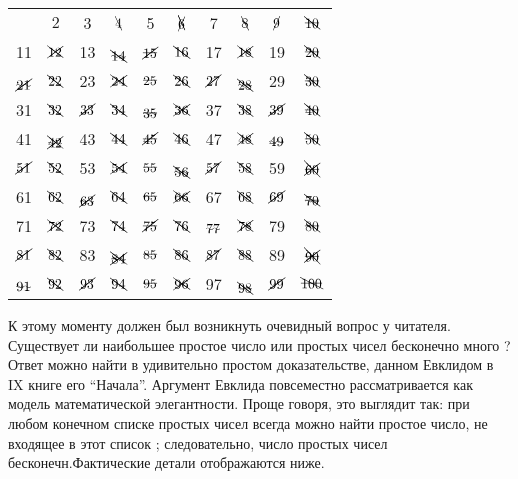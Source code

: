 \documentclass[11pt]{article}
\newcommand{\out}[1]{\raisebox{1pt}{\sout{\phantom{#1}}}\llap{#1}}
\newcommand{\wavy}[1]{\raisebox{5pt}{\uwave{\phantom{#1}}}\llap{#1}}
\begin{document}
\begin{center}
\begin {tabular}{c c c c c c c c c c}
 &$2$&3&$\bcancel4$&5&$\bcancel{\cancel6}$&7&$\bcancel8$&$\cancel9$&$\bcancel{\out{10}}$\\
 11&$\bcancel{\cancel{12}}$&13&$\wavy{\bcancel{14}}$&$\out{\cancel{15}}$&$\bcancel{16}$&17&$\bcancel{\cancel{18}}$&19&$\bcancel{\out{20}}$\\
 $\wavy{\cancel{{21}}}$&$\bcancel{22}$&23&$\bcancel{\cancel{24}}$&$\out{25}$&$\bcancel{26}$&$\cancel{27}$&$\wavy{\bcancel{28}}$&29&$\bcancel{\out{30}}$\\
 31&$\bcancel{32}$&$\cancel{33}$&$\bcancel{34}$&$\wavy{\out{35}}$&$\bcancel{\cancel{36}}$&37&$\bcancel{38}$&$\cancel{39}$&$\bcancel{\out{40}}$\\
 41&$\wavy{\bcancel{\cancel{42}}}$&43&$\bcancel{44}$&$\cancel{\out{45}}$&$\bcancel{46}$&47&$\bcancel{\cancel{48}}$&$\wavy{49}$&$\bcancel{\out{50}}$\\
 $\cancel{51}$&$\bcancel{52}$&53&$\bcancel{\cancel{54}}$&$\out{55}$&$\wavy{\bcancel{56}}$&$\cancel{57}$&$\bcancel{58}$&59&$\bcancel{\cancel{\out{60}}}$\\
 61&$\bcancel{62}$&$\wavy{\cancel{63}}$&$\bcancel{64}$&$\out{65}$&$\bcancel{\cancel{66}}$&67&$\bcancel{68}$&$\cancel{69}$&$\wavy{\bcancel{\out{70}}}$\\
 71&$\bcancel{\cancel{72}}$&73&$\bcancel{74}$&$\cancel{\out{75}}$&$\bcancel{76}$&$\wavy{77}$&$\bcancel{\cancel{78}}$&79&$\bcancel{\out{80}}$\\
 $\cancel{81}$&$\bcancel{82}$&83&$\wavy{\bcancel{\cancel{84}}}$&$\out{85}$&$\bcancel{86}$&$\cancel{87}$&$\bcancel{88}$&89&$\bcancel{\cancel{\out{90}}}$\\
 $\wavy{91}$&$\bcancel{92}$&$\cancel{93}$&$\bcancel{94}$&$\out{95}$&$\bcancel{\cancel{96}}$&97&$\wavy{\bcancel{98}}$&$\cancel{99}$&$\bcancel{\out{100}}$\\
 
\end{tabular}
\end{center}

К этому моменту должен был возникнуть очевидный вопрос у читателя. Существует ли наибольшее простое число или простых чисел бесконечно много ? Ответ можно найти в удивительно простом доказательстве, данном Евклидом в IX книге его “Начала”. Аргумент Евклида повсеместно рассматривается как модель математической элегантности. Проще говоря, это выглядит так: при любом конечном списке простых чисел всегда можно найти простое число, не входящее в этот список ; следовательно, число простых чисел бесконечн.Фактические детали отображаются ниже.
\end{document}
